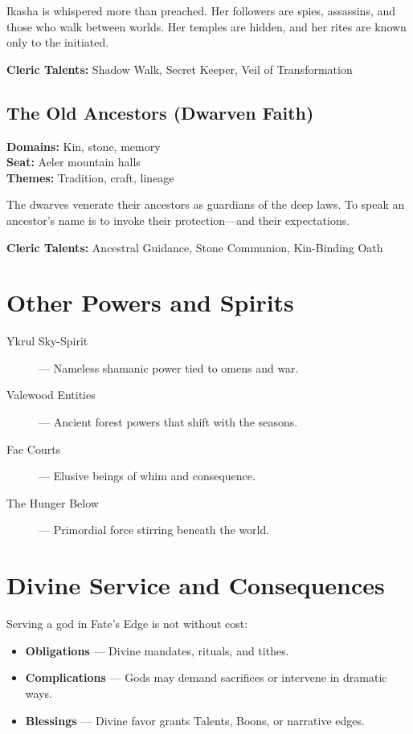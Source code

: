 Ikasha is whispered more than preached. Her followers are spies, assassins, and those who walk between worlds. Her temples are hidden, and her rites are known only to the initiated.

\textbf{Cleric Talents:} Shadow Walk, Secret Keeper, Veil of Transformation

\subsection*{The Old Ancestors (Dwarven Faith)}

\textbf{Domains:} Kin, stone, memory \\
\textbf{Seat:} Aeler mountain halls \\
\textbf{Themes:} Tradition, craft, lineage

The dwarves venerate their ancestors as guardians of the deep laws. To speak an ancestor's name is to invoke their protection—and their expectations.

\textbf{Cleric Talents:} Ancestral Guidance, Stone Communion, Kin-Binding Oath

\section{Other Powers and Spirits}

\begin{description}
  \item[Ykrul Sky-Spirit]  — Nameless shamanic power tied to omens and war.
  \item[Valewood Entities]  — Ancient forest powers that shift with the seasons.
  \item[Fae Courts]  — Elusive beings of whim and consequence.
  \item[The Hunger Below]  — Primordial force stirring beneath the world.
\end{description}

\section{Divine Service and Consequences}

Serving a god in Fate's Edge is not without cost:

\begin{itemize}
  \item \textbf{Obligations} — Divine mandates, rituals, and tithes.
  \item \textbf{Complications} — Gods may demand sacrifices or intervene in dramatic ways.
  \item \textbf{Blessings} — Divine favor grants Talents, Boons, or narrative edges.
\end{itemize}

